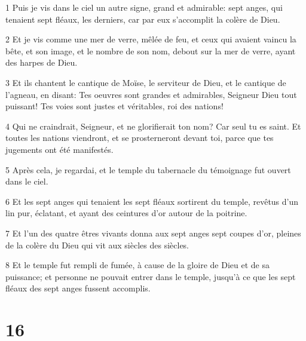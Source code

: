 \par 1 Puis je vis dans le ciel un autre signe, grand et admirable: sept anges, qui tenaient sept fléaux, les derniers, car par eux s'accomplit la colère de Dieu.
\par 2 Et je vis comme une mer de verre, mêlée de feu, et ceux qui avaient vaincu la bête, et son image, et le nombre de son nom, debout sur la mer de verre, ayant des harpes de Dieu.
\par 3 Et ils chantent le cantique de Moïse, le serviteur de Dieu, et le cantique de l'agneau, en disant: Tes oeuvres sont grandes et admirables, Seigneur Dieu tout puissant! Tes voies sont justes et véritables, roi des nations!
\par 4 Qui ne craindrait, Seigneur, et ne glorifierait ton nom? Car seul tu es saint. Et toutes les nations viendront, et se prosterneront devant toi, parce que tes jugements ont été manifestés.
\par 5 Après cela, je regardai, et le temple du tabernacle du témoignage fut ouvert dans le ciel.
\par 6 Et les sept anges qui tenaient les sept fléaux sortirent du temple, revêtus d'un lin pur, éclatant, et ayant des ceintures d'or autour de la poitrine.
\par 7 Et l'un des quatre êtres vivants donna aux sept anges sept coupes d'or, pleines de la colère du Dieu qui vit aux siècles des siècles.
\par 8 Et le temple fut rempli de fumée, à cause de la gloire de Dieu et de sa puissance; et personne ne pouvait entrer dans le temple, jusqu'à ce que les sept fléaux des sept anges fussent accomplis.

\chapter{16}

